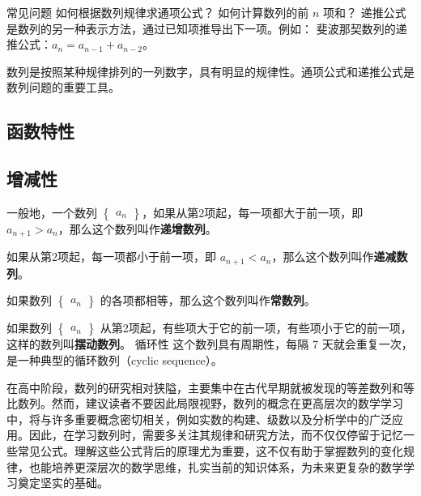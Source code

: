 常见问题
如何根据数列规律求通项公式？
如何计算数列的前 $n$ 项和？
递推公式是数列的另一种表示方法，通过已知项推导出下一项。例如：
斐波那契数列的递推公式：$a_n = a_{n-1} + a_{n-2}$。

数列是按照某种规律排列的一列数字，具有明显的规律性。通项公式和递推公式是数列问题的重要工具。
\subsection{函数特性}

\subsection{增减性}
一般地，一个数列 $\begin{Bmatrix} a_n \end{Bmatrix}$，如果从第2项起，每一项都大于前一项，即 $a_{n+1}>a_n$，那么这个数列叫作\textbf{递增数列}。

如果从第2项起，每一项都小于前一项，即 $a_{n+1}<a_n$，那么这个数列叫作\textbf{递减数列}。

如果数列 $\begin{Bmatrix} a_n \end{Bmatrix}$ 的各项都相等，那么这个数列叫作\textbf{常数列}。

如果数列 $\begin{Bmatrix} a_n \end{Bmatrix}$ 从第2项起，有些项大于它的前一项，有些项小于它的前一项，这样的数列叫\textbf{摆动数列}。
循环性
这个数列具有周期性，每隔 7 天就会重复一次，是一种典型的循环数列（cyclic sequence）。

在高中阶段，数列的研究相对狭隘，主要集中在古代早期就被发现的等差数列和等比数列。然而，建议读者不要因此局限视野，数列的概念在更高层次的数学学习中，将与许多重要概念密切相关，例如实数的构建、级数以及分析学中的广泛应用。因此，在学习数列时，需要多关注其规律和研究方法，而不仅仅停留于记忆一些常见公式。理解这些公式背后的原理尤为重要，这不仅有助于掌握数列的变化规律，也能培养更深层次的数学思维，扎实当前的知识体系，为未来更复杂的数学学习奠定坚实的基础。